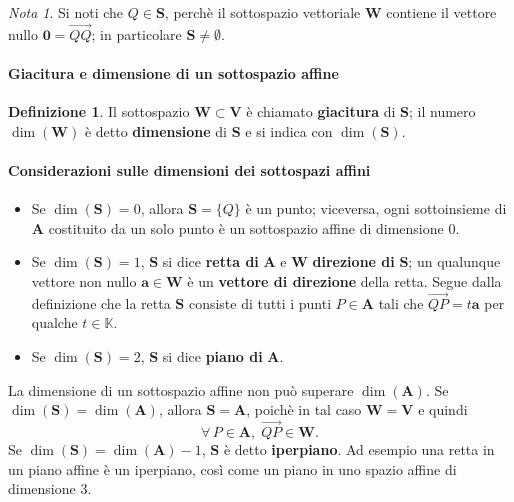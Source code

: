 \documentclass{article}
\theoremstyle{plain}
\theoremstyle{definition}
\newtheorem{defn}{Definizione}[section]
\theoremstyle{remark}
\newtheorem{note}{Nota}
\begin{document}
\vspace{10pt}

\begin{note}
    Si noti che $Q\in\mathbf{S}$, perchè il sottospazio vettoriale $\mathbf{W}$ contiene il vettore nullo $\mathbf{0}=\overrightarrow{QQ}$; in particolare $\mathbf{S}\neq\emptyset$.
\end{note}

\vspace{10pt}

\paragraph{Giacitura e dimensione di un sottospazio affine}
\begin{bxthm}
\begin{defn}
    Il sottospazio $\mathbf{W}\subset\mathbf{V}$ è chiamato \textbf{giacitura} di $\mathbf{S}$; il numero $\dim(\mathbf{W})$ è detto \textbf{dimensione} di $\mathbf{S}$ e si indica con $\dim(\mathbf{S})$.    
\end{defn}
\end{bxthm}

\vspace{10pt}

\paragraph{Considerazioni sulle dimensioni dei sottospazi affini}
\begin{itemize}
    \item Se $\dim(\mathbf{S})=0$, allora $\mathbf{S}=\{Q\}$ è un punto; viceversa, ogni sottoinsieme di $\mathbf{A}$ costituito da un solo punto è un sottospazio affine di dimensione $0$.
    \item Se $\dim(\mathbf{S})=1$, $\mathbf{S}$ si dice \textbf{retta di} $\mathbf{A}$ e $\mathbf{W}$ \textbf{direzione di} $\mathbf{S}$; un qualunque vettore non nullo $\mathbf{a}\in\mathbf{W}$ è un \textbf{vettore di direzione} della retta.
    Segue dalla definizione che la retta $\mathbf{S}$ consiste di tutti i punti $P\in\mathbf{A}$ tali che $\overrightarrow{QP}=t\mathbf{a}$ per qualche $t\in\mathbb{K}$.
    \item Se $\dim(\mathbf{S})=2$, $\mathbf{S}$ si dice \textbf{piano di} $\mathbf{A}$.
\end{itemize}
La dimensione di un sottospazio affine non può superare $\dim(\mathbf{A})$. Se $\dim(\mathbf{S})=\dim(\mathbf{A})$, allora $\mathbf{S}=\mathbf{A}$, poichè in tal caso $\mathbf{W}=\mathbf{V}$ e quindi \[\forall\,P\in\mathbf{A},\;\overrightarrow{QP}\in\mathbf{W}.\]
Se $\dim(\mathbf{S})=\dim(\mathbf{A})-1$, $\mathbf{S}$ è detto \textbf{iperpiano}. Ad esempio una retta in un piano affine è un iperpiano, così come un piano in uno spazio affine di dimensione 3.
\end{document}
